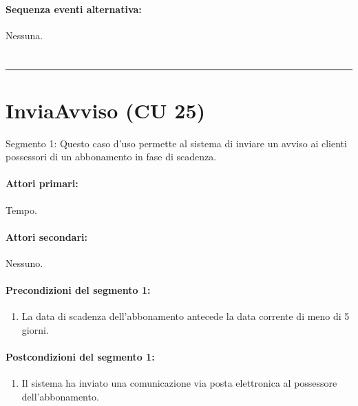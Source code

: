 \documentclass{article}
\begin{document}
	\paragraph{Sequenza eventi alternativa:} Nessuna.
    	
	



	\section*{}
\par\noindent\rule{\textwidth}{0.4pt}
	
\section*{InviaAvviso (CU 25)}
	
\indent\indent Segmento 1: Questo caso d'uso permette al sistema di inviare un avviso ai clienti possessori di un abbonamento in fase di scadenza.
	
	\paragraph{Attori primari:}Tempo.
	
	\paragraph{Attori secondari:}Nessuno.
	
	\paragraph{Precondizioni del segmento 1:}
		\begin{enumerate}	[leftmargin=28pt]
			\item La data di scadenza dell’abbonamento antecede la data corrente di meno di 5 giorni.
	    	\end{enumerate}
	\paragraph{Postcondizioni del segmento 1:} 
		\begin{enumerate}	[leftmargin=28pt]
			\item Il sistema ha inviato una comunicazione via posta elettronica al possessore dell'abbonamento.
	    	\end{enumerate}
\end{document}
